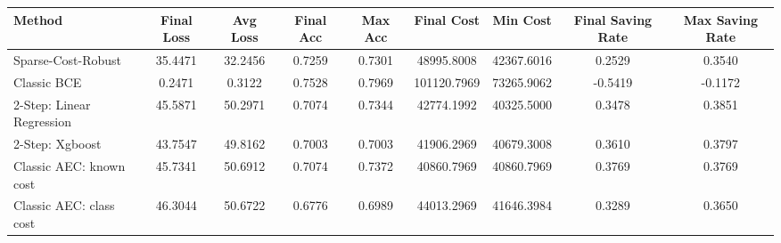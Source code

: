 \begin{tabular}{lcccccccc}
\toprule
Method & Final Loss & Avg Loss & Final Acc & Max Acc & Final Cost & Min Cost & Final Saving Rate & Max Saving Rate \\
\midrule
Sparse-Cost-Robust & 35.4471 & 32.2456 & 0.7259 & 0.7301 & 48995.8008 & 42367.6016 & 0.2529 & 0.3540 \\
Classic BCE & 0.2471 & 0.3122 & 0.7528 & 0.7969 & 101120.7969 & 73265.9062 & -0.5419 & -0.1172 \\
2-Step: Linear Regression & 45.5871 & 50.2971 & 0.7074 & 0.7344 & 42774.1992 & 40325.5000 & 0.3478 & 0.3851 \\
2-Step: Xgboost & 43.7547 & 49.8162 & 0.7003 & 0.7003 & 41906.2969 & 40679.3008 & 0.3610 & 0.3797 \\
Classic AEC: known cost & 45.7341 & 50.6912 & 0.7074 & 0.7372 & 40860.7969 & 40860.7969 & 0.3769 & 0.3769 \\
Classic AEC: class cost & 46.3044 & 50.6722 & 0.6776 & 0.6989 & 44013.2969 & 41646.3984 & 0.3289 & 0.3650 \\
\bottomrule
\end{tabular}

